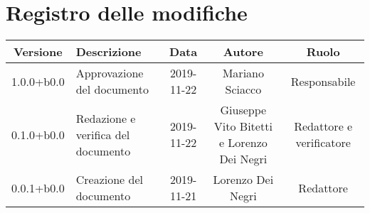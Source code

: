 \section*{Registro delle modifiche}

\begin{center}
	\begin{longtable}{|c|p{3cm}|c|c|c|}
	\hline
	\rowcolor{lighter-grayer}
	\textbf{Versione} & \textbf{Descrizione} & \textbf{Data} & \textbf{Autore} & \textbf{Ruolo} \\
	\hline
	\endfirsthead


	1.0.0+b0.0 & Approvazione del documento & 2019-11-22 & Mariano Sciacco & Responsabile \\
	\hline
	0.1.0+b0.0 & Redazione e verifica del documento & 2019-11-22 & Giuseppe Vito Bitetti e Lorenzo Dei Negri & Redattore e verificatore \\
	\hline
	0.0.1+b0.0 & Creazione del documento & 2019-11-21 & Lorenzo Dei Negri & Redattore \\

	\hline

	\end{longtable}
\end{center}
